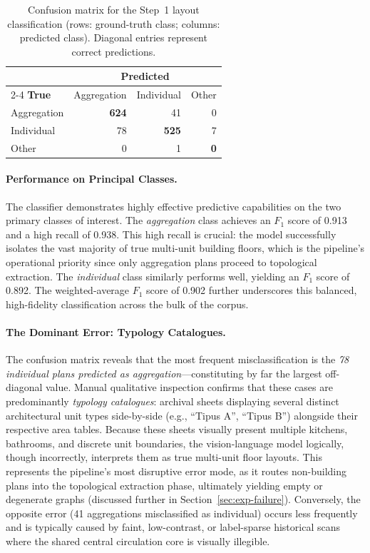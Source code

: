 \documentclass[12pt,a4paper,openright]{report}
\begin{document}
\begin{table}[ht]
\centering
\begin{tabular}{@{}lrrr@{}}
\toprule
 & \multicolumn{3}{c}{\textbf{Predicted}} \\
\cmidrule(l){2-4}
\textbf{True} & Aggregation & Individual & Other \\
\midrule
Aggregation & \textbf{624} & 41 & 0 \\
Individual  & 78 & \textbf{525} & 7 \\
Other       & 0 & 1 & \textbf{0} \\
\bottomrule
\end{tabular}
\caption{Confusion matrix for the Step~1 layout classification (rows: ground-truth class; columns: predicted class). Diagonal entries represent correct predictions.}
\label{tab:confusion}
\end{table}

\paragraph{Performance on Principal Classes.} The classifier demonstrates highly effective predictive capabilities on the two primary classes of interest. The \textit{aggregation} class achieves an $F_1$ score of 0.913 and a high recall of 0.938. This high recall is crucial: the model successfully isolates the vast majority of true multi-unit building floors, which is the pipeline's operational priority since only aggregation plans proceed to topological extraction. The \textit{individual} class similarly performs well, yielding an $F_1$ score of 0.892. The weighted-average $F_1$ score of 0.902 further underscores this balanced, high-fidelity classification across the bulk of the corpus.

\paragraph{The Dominant Error: Typology Catalogues.} The confusion matrix reveals that the most frequent misclassification is the \emph{78 individual plans predicted as aggregation}---constituting by far the largest off-diagonal value. Manual qualitative inspection confirms that these cases are predominantly \emph{typology catalogues}: archival sheets displaying several distinct architectural unit types side-by-side (e.g., ``Tipus A'', ``Tipus B'') alongside their respective area tables. Because these sheets visually present multiple kitchens, bathrooms, and discrete unit boundaries, the vision-language model logically, though incorrectly, interprets them as true multi-unit floor layouts. This represents the pipeline's most disruptive error mode, as it routes non-building plans into the topological extraction phase, ultimately yielding empty or degenerate graphs (discussed further in Section~\ref{sec:exp-failure}). Conversely, the opposite error (41 aggregations misclassified as individual) occurs less frequently and is typically caused by faint, low-contrast, or label-sparse historical scans where the shared central circulation core is visually illegible.
\end{document}

